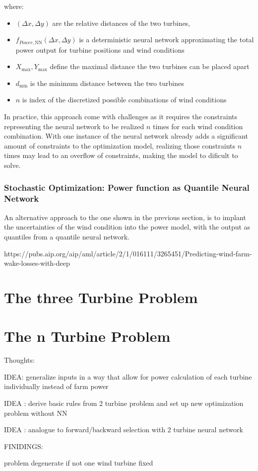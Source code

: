 where:
\begin{itemize}
	\item \( (\Delta x, \Delta y) \) are the relative distances of the two turbines,
	\item \( f_{Power, \text{NN}}(\Delta x, \Delta y)\) is a deterministic neural network  approximating the total power output for turbine positions and wind conditions
	\item \(  X_{\max}, Y_{\max} \) define the maximal distance the two turbines can be placed apart
	\item \( d_{\min} \) is the minimum distance between the two turbines
	\item \( n \) is index of the discretized possible combinations of wind conditions 
\end{itemize}

In practice, this approach come with challenges as it requires the constraints representing the neural network to be realized $n$ times for each wind condition combination. With one instance of the neural network already adds a significant amount of constraints to the optimization model, realizing those constraints $n$ times may lead to an overflow of constraints, making the model to dificult to solve.
	
\subsubsection{Stochastic Optimization:  Power function as Quantile Neural Network}

An alternative approach to the one shown in the previous section, is to implant the uncertainties of the wind condition into the power model, with the output as quantiles from a quantile neural network. 


https://pubs.aip.org/aip/aml/article/2/1/016111/3265451/Predicting-wind-farm-wake-losses-with-deep

	

\section{The three Turbine Problem}

\section{The n Turbine Problem}

Thoughts: 

IDEA: generalize inputs in a way that allow for power calculation of each turbine individually instead of farm power

IDEA : derive basic rules from 2 turbine problem and set up new optimization problem without NN 

IDEA : analogue to forward/backward selection with 2 turbine neural network


FINIDINGS: 

problem degenerate if not one wind turbine fixed